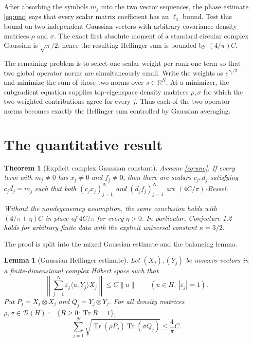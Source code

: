 \documentclass[11pt]{article}
\newtheorem{theorem}{Theorem}
\newtheorem{lemma}{Lemma}
\newcommand{\R}{\mathbb R}
\newcommand{\Dens}{\mathcal D}
\newcommand{\Tr}{\operatorname{Tr}}
\begin{document}
After absorbing the symbols $m_j$ into the two vector sequences, the phase
estimate \eqref{eq:unc} says that every scalar matrix coefficient has an
$\ell_1$ bound.  Test this bound on two independent Gaussian vectors with
arbitrary covariance density matrices $\rho$ and $\sigma$.  The exact first
absolute moment of a standard circular complex Gaussian is
$\sqrt\pi/2$; hence the resulting Hellinger sum is bounded by
$(4/\pi)C$.

The remaining problem is to select one scalar weight per rank-one term so
that two global operator norms are simultaneously small.  Write the weights
as $e^{s_j/2}$ and minimize the sum of those two norms over $s\in\R^N$.
At a minimizer, the subgradient equation supplies top-eigenspace density
matrices $\rho,\sigma$ for which the two weighted contributions agree for
every $j$.  Thus each of the two operator norms becomes exactly the
Hellinger sum controlled by Gaussian averaging.

\section*{The quantitative result}

\begin{theorem}[Explicit complex Gaussian constant]\label{thm:main}
Assume \eqref{eq:unc}.  If every term with $m_j\neq0$ has
$x_j\neq0$ and $f_j\neq0$, then there are scalars $c_j,d_j$ satisfying
$c_j\overline{d_j}=m_j$ such that both $(c_jx_j)_{j=1}^N$ and
$(d_jf_j)_{j=1}^N$ are $(4C/\pi)$-Bessel.

Without the nondegeneracy assumption, the same conclusion holds with
$(4/\pi+\eta)C$ in place of $4C/\pi$ for every $\eta>0$.  In particular,
Conjecture 1.2 holds for arbitrary finite data with the explicit universal
constant $\kappa=3/2$.
\end{theorem}

The proof is split into the mixed Gaussian estimate and the balancing lemma.

\begin{lemma}[Gaussian Hellinger estimate]\label{lem:gaussian}
Let $(X_j),(Y_j)$ be nonzero vectors in a finite-dimensional complex Hilbert
space such that
\begin{equation}\label{eq:reduced}
 \left\|\sum_{j=1}^N\varepsilon_j
       \langle u,Y_j\rangle X_j\right\|
 \leq C\|u\| \qquad(u\in H,\ |\varepsilon_j|=1).
\end{equation}
Put $P_j=X_j\otimes X_j$ and $Q_j=Y_j\otimes Y_j$.  For all density
matrices $\rho,\sigma\in\Dens(H):=\{R\geq0:\Tr R=1\}$,
\begin{equation}\label{eq:hellinger}
 \sum_{j=1}^N
 \sqrt{\Tr(\rho P_j)\Tr(\sigma Q_j)}
 \leq \frac4\pi C.
\end{equation}
\end{lemma}
\end{document}
